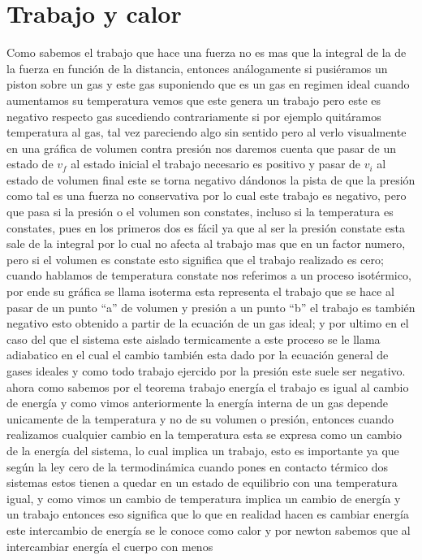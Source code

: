 \documentclass{article}
\begin{document}
\section*{Trabajo y calor}
Como sabemos el trabajo que hace una fuerza no es mas que la integral de la de la fuerza en función de la distancia, entonces análogamente si pusiéramos un piston
sobre un gas y este gas suponiendo que es un gas en regimen ideal cuando aumentamos su temperatura vemos que este genera un trabajo pero este es negativo respecto gas
sucediendo contrariamente si por ejemplo quitáramos temperatura al gas, tal vez pareciendo algo sin sentido pero al verlo visualmente en una gráfica de volumen
contra presión nos daremos cuenta que pasar de un estado de $v_f$ al estado inicial el trabajo necesario es positivo y pasar de $v_i$ al estado de volumen final
este se torna negativo dándonos la pista de que la presión como tal es una fuerza no conservativa por lo cual este trabajo es negativo,
pero que pasa si la presión o el volumen son constates, incluso si la temperatura es constates, pues en los primeros dos es fácil ya que al ser la presión constate
esta sale de la integral por lo cual no afecta al trabajo mas que en un factor numero, pero si el volumen es constate esto significa que el trabajo realizado es cero;
cuando hablamos de temperatura constate nos referimos a un proceso isotérmico, por ende su gráfica se llama isoterma esta representa el trabajo que se hace al pasar
de un punto ``a'' de volumen y presión a un punto ``b'' el trabajo es también negativo esto obtenido a partir de la ecuación de un gas ideal; y por ultimo
en el caso del que el sistema este aislado termicamente a este proceso se le llama adiabatico en el cual el cambio también esta dado por la ecuación general de gases
ideales y como todo trabajo ejercido por la presión este suele ser negativo.
ahora como sabemos por el teorema trabajo energía el trabajo es igual al cambio de energía y como vimos anteriormente la energía interna de un gas depende unicamente
de la temperatura y no de su volumen o presión, entonces cuando realizamos cualquier cambio en la temperatura esta se expresa como un cambio de la energía del sistema,
lo cual implica un trabajo, esto es importante ya que según la ley cero de la termodinámica cuando pones en contacto térmico dos sistemas estos tienen a quedar en un 
estado de equilibrio con una temperatura igual, y como vimos un cambio de temperatura implica un cambio de energía y un trabajo entonces eso significa que 
lo que en realidad hacen es cambiar energía este intercambio de energía se le conoce como calor y por newton sabemos que al intercambiar energía el cuerpo con menos
\end{document}

